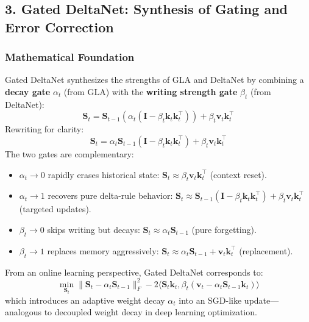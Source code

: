 \documentclass[11pt,a4paper]{article}
\begin{document}
\subsection{3. Gated DeltaNet: Synthesis of Gating and Error Correction}

\subsubsection{Mathematical Foundation}

Gated DeltaNet \citep{yang_gated_deltanet_2024} synthesizes the strengths of GLA and DeltaNet by combining a \textbf{decay gate} $\alpha_t$ (from GLA) with the \textbf{writing strength gate} $\beta_t$ (from DeltaNet):
\[
\mathbf{S}_t = \mathbf{S}_{t-1}\left(\alpha_t (\mathbf{I} - \beta_t \mathbf{k}_t \mathbf{k}_t^\top)\right) + \beta_t \mathbf{v}_t \mathbf{k}_t^\top
\]
Rewriting for clarity:
\[
\mathbf{S}_t = \alpha_t \mathbf{S}_{t-1}(\mathbf{I} - \beta_t \mathbf{k}_t \mathbf{k}_t^\top) + \beta_t \mathbf{v}_t \mathbf{k}_t^\top
\]
The two gates are complementary:
\begin{itemize}[leftmargin=*]
    \item $\alpha_t \to 0$ rapidly erases historical state: $\mathbf{S}_t \approx \beta_t \mathbf{v}_t \mathbf{k}_t^\top$ (context reset).
    \item $\alpha_t \to 1$ recovers pure delta-rule behavior: $\mathbf{S}_t \approx \mathbf{S}_{t-1}(\mathbf{I} - \beta_t \mathbf{k}_t \mathbf{k}_t^\top) + \beta_t \mathbf{v}_t \mathbf{k}_t^\top$ (targeted updates).
    \item $\beta_t \to 0$ skips writing but decays: $\mathbf{S}_t \approx \alpha_t \mathbf{S}_{t-1}$ (pure forgetting).
    \item $\beta_t \to 1$ replaces memory aggressively: $\mathbf{S}_t \approx \alpha_t \mathbf{S}_{t-1} + \mathbf{v}_t \mathbf{k}_t^\top$ (replacement).
\end{itemize}

From an online learning perspective, Gated DeltaNet corresponds to:
\[
\min_{\mathbf{S}_t} \|\mathbf{S}_t - \alpha_t \mathbf{S}_{t-1}\|_F^2 - 2\langle \mathbf{S}_t \mathbf{k}_t, \beta_t(\mathbf{v}_t - \alpha_t \mathbf{S}_{t-1} \mathbf{k}_t)\rangle
\]
which introduces an adaptive weight decay $\alpha_t$ into an SGD-like update---analogous to decoupled weight decay in deep learning optimization.
\end{document}
